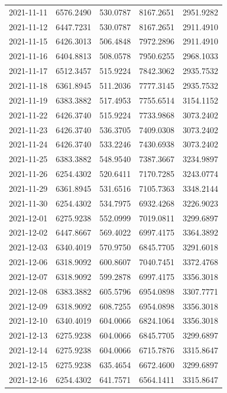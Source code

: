 {\begin{longtable}{lllll}
2021-11-11 & 6576.2490 & 530.0787 & 8167.2651 & 2951.9282 \\
2021-11-12 & 6447.7231 & 530.0787 & 8167.2651 & 2911.4910 \\
2021-11-15 & 6426.3013 & 506.4848 & 7972.2896 & 2911.4910 \\
2021-11-16 & 6404.8813 & 508.0578 & 7950.6255 & 2968.1033 \\
2021-11-17 & 6512.3457 & 515.9224 & 7842.3062 & 2935.7532 \\
2021-11-18 & 6361.8945 & 511.2036 & 7777.3145 & 2935.7532 \\
2021-11-19 & 6383.3882 & 517.4953 & 7755.6514 & 3154.1152 \\
2021-11-22 & 6426.3740 & 515.9224 & 7733.9868 & 3073.2402 \\
2021-11-23 & 6426.3740 & 536.3705 & 7409.0308 & 3073.2402 \\
2021-11-24 & 6426.3740 & 533.2246 & 7430.6938 & 3073.2402 \\
2021-11-25 & 6383.3882 & 548.9540 & 7387.3667 & 3234.9897 \\
2021-11-26 & 6254.4302 & 520.6411 & 7170.7285 & 3243.0774 \\
2021-11-29 & 6361.8945 & 531.6516 & 7105.7363 & 3348.2144 \\
2021-11-30 & 6254.4302 & 534.7975 & 6932.4268 & 3226.9023 \\
2021-12-01 & 6275.9238 & 552.0999 & 7019.0811 & 3299.6897 \\
2021-12-02 & 6447.8667 & 569.4022 & 6997.4175 & 3364.3892 \\
2021-12-03 & 6340.4019 & 570.9750 & 6845.7705 & 3291.6018 \\
2021-12-06 & 6318.9092 & 600.8607 & 7040.7451 & 3372.4768 \\
2021-12-07 & 6318.9092 & 599.2878 & 6997.4175 & 3356.3018 \\
2021-12-08 & 6383.3882 & 605.5796 & 6954.0898 & 3307.7771 \\
2021-12-09 & 6318.9092 & 608.7255 & 6954.0898 & 3356.3018 \\
2021-12-10 & 6340.4019 & 604.0066 & 6824.1064 & 3356.3018 \\
2021-12-13 & 6275.9238 & 604.0066 & 6845.7705 & 3299.6897 \\
2021-12-14 & 6275.9238 & 604.0066 & 6715.7876 & 3315.8647 \\
2021-12-15 & 6275.9238 & 635.4654 & 6672.4600 & 3299.6897 \\
2021-12-16 & 6254.4302 & 641.7571 & 6564.1411 & 3315.8647 \\

\end{longtable}}
